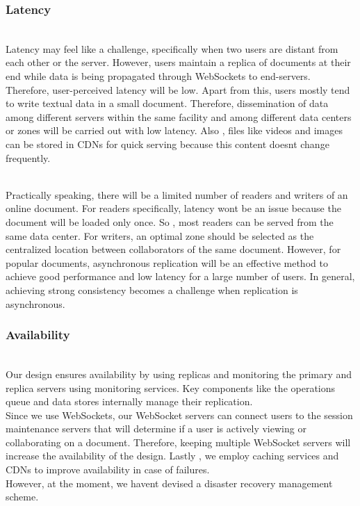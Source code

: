 \subsubsection{Latency}\label{u6wU_1KU44yhtX8PDvZm6}
\\
Latency may feel like a challenge, specifically when two users are distant from each other or the server. However, users maintain a replica of documents at their end while data is being propagated through WebSockets to end-servers. Therefore, user-perceived latency will be low. Apart from this, users mostly tend to write textual data in a small document. Therefore, dissemination of data among different servers within the same facility and among different data centers or zones will be carried out with low latency. Also , files like videos and images can be stored in CDNs for quick serving because this content doesn\textquotesingle t change frequently.\\
\strut \\
Practically speaking, there will be a limited number of readers and writers of an online document. For readers specifically, latency won\textquotesingle t be an issue because the document will be loaded only once. So , most readers can be served from the same data center. For writers, an optimal zone should be selected as the centralized location between collaborators of the same document. However, for popular documents, asynchronous replication will be an effective method to achieve good performance and low latency for a large number of users. In general, achieving strong consistency becomes a challenge when replication is asynchronous.

\subsubsection{Availability}\label{c_F1Yp9kSZNL0igmsOVCl-1}
\\
Our design ensures availability by using replicas and monitoring the primary and replica servers using monitoring services. Key components like the operations queue and data stores internally manage their replication.
\\
Since we use WebSockets, our WebSocket servers can connect users to the session maintenance servers that will determine if a user is actively viewing or collaborating on a document. Therefore, keeping multiple WebSocket servers will increase the availability of the design. Lastly , we employ caching services and CDNs to improve availability in case of failures.
\\
However, at the moment, we haven\textquotesingle t devised a disaster recovery management scheme.

